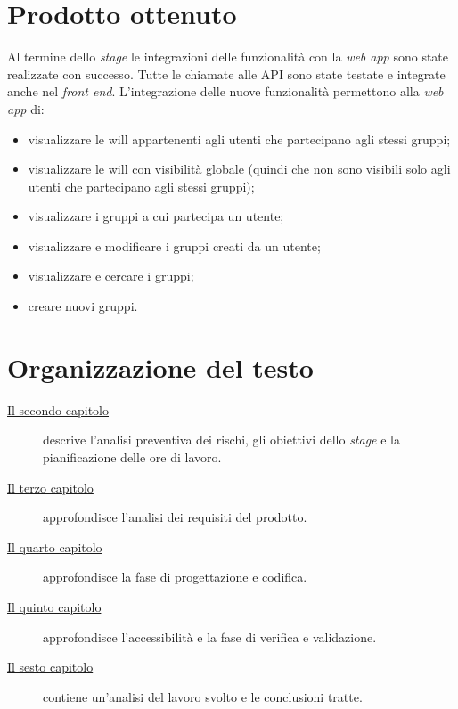 \section{Prodotto ottenuto}
Al termine dello \textit{stage} le integrazioni delle funzionalità con la
\textit{web app} sono state realizzate con successo. Tutte le chiamate alle
\gls{API}
sono state testate e integrate anche nel \textit{front end}.
L'integrazione delle nuove funzionalità permettono alla \textit{web app} di:
\begin{itemize}
      \item  visualizzare le \gls{will} appartenenti agli utenti che
            partecipano
            agli stessi gruppi;
      \item visualizzare le \gls{will} con visibilità globale (quindi che non
            sono visibili solo agli utenti che partecipano agli stessi gruppi);
      \item visualizzare i gruppi a cui partecipa un utente;
      \item visualizzare e modificare i gruppi creati da un utente;
      \item visualizzare e cercare i gruppi;
      \item creare nuovi gruppi.
\end{itemize}
\section{Organizzazione del testo}

\begin{description}
      \item[{\hyperref[cap:descrizione-stage]{Il secondo capitolo}}] descrive
      l'analisi preventiva dei rischi, gli obiettivi dello \textit{stage} e
      la pianificazione delle ore di lavoro.
      \item[{\hyperref[cap:analisi-requisiti]{Il terzo capitolo}}]
      approfondisce
      l'analisi dei requisiti del prodotto.

      \item[{\hyperref[cap:progettazione-codifica]{Il quarto capitolo}}]
      approfondisce la fase di progettazione e codifica.

      \item[{\hyperref[cap:verifica-validazione]{Il quinto capitolo}}]
      approfondisce l'accessibilità e la fase di verifica e validazione.

      \item[{\hyperref[cap:conclusioni]{Il sesto capitolo}}] contiene
      un’analisi
      del lavoro svolto e le conclusioni tratte.
\end{description}

